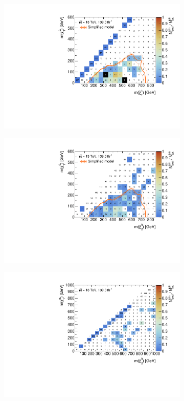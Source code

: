  \begin{figure}
	\centering
	\begin{subfigure}[b]{0.5\linewidth}
		\centering\includegraphics[width=\textwidth]{cut_none/mchi1p_mlsp_contour}
	\end{subfigure}\hfill
	\begin{subfigure}[b]{0.5\linewidth}
		\centering\includegraphics[width=\textwidth]{cut_none/mchi20_mlsp_contour}
	\end{subfigure}\hfill
	\begin{subfigure}[b]{0.5\linewidth}
		\centering\includegraphics[width=\textwidth]{cut_none/mchi1p_mchi20_contour}

\end{subfigure}
\end{figure}
